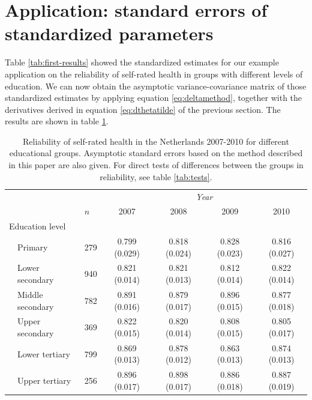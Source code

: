 \documentclass[a4paper,11pt]{article}
\newcommand{\0}{\boldsymbol{0}}
\begin{document}
\section{Application: standard errors of standardized parameters}

Table  \ref{tab:first-results} showed the standardized estimates for our example application on the
reliability of self-rated health in groups with different levels of education. We can now obtain the 
 asymptotic variance-covariance matrix of those standardized estimates 
by applying equation \ref{eq:deltamethod}, together with the derivatives derived in equation \ref{eq:dthetatilde} of the previous section. The results are shown in table \ref{tab:health-education}.

\begin{table}[tbh]
\begin{center}
\begin{tabular}{lllcccc}  \hline  \hline
&&&  \multicolumn{4}{c}{\emph{Year}}\\\cline{4-7}
&&$n$& 2007&2008&2009&2010\\
  \hline
  \multicolumn{2}{l}{Education level}\\
& Primary	   & 279  & 0.799 (0.029) & 0.818 (0.024) & 0.828 (0.023) & 0.816 (0.027) \\ 
& Lower secondary  & 940  & 0.821 (0.014) & 0.821 (0.013) & 0.812 (0.014) & 0.822 (0.014) \\ 
& Middle secondary & 782  & 0.891 (0.016) & 0.879 (0.017) & 0.896 (0.015) & 0.877 (0.018) \\ 
& Upper secondary  & 369  & 0.822 (0.015) & 0.820 (0.014) & 0.808 (0.015) & 0.805 (0.017) \\ 
& Lower tertiary   & 799  & 0.869 (0.013) & 0.878 (0.012) & 0.863 (0.013) & 0.874 (0.013) \\ 
& Upper tertiary   & 256  & 0.896 (0.017) & 0.898 (0.017) & 0.886 (0.018) & 0.887 (0.019) \\ 
  \hline     \hline
\end{tabular}
\caption{Reliability of self-rated health in the Netherlands 2007-2010 for different educational groups. 
Asymptotic standard errors based on the method described in this paper are also given. For direct tests of 
differences between the groups in reliability, see table \ref{tab:tests}.}\label{tab:health-education}
\end{center}
\end{table}
\end{document}
